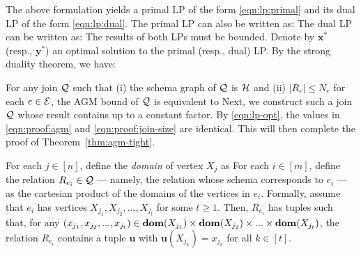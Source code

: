 \vgap

The above formulation yields a primal LP of the form \eqref{eqn:lp:primal} and its dual LP of the form \eqref{eqn:lp:dual}. The primal LP can also be written as:
The dual LP can be written as:
The results of both LPs must be bounded. Denote by $\bm{x}^*$ (resp., $\bm{y}^*$) an optimal solution to the primal (resp., dual) LP. By the strong duality theorem, we have:

\vgap

For any join $\mathcal{Q}$ such that (i) the schema graph of $\mathcal{Q}$ is $\mathcal{H}$ and (ii) $|R_e| \le N_e$ for each $e \in \mathcal{E}$, the AGM bound of $\mathcal{Q}$ is equivalent to
Next, we construct such a join $\mathcal{Q}$ whose result contains
up to a constant factor. By \eqref{eqn:lp-opt}, the values in \eqref{eqn:proof:agm} and \eqref{eqn:proof:join-size} are identical. This will then complete the proof of Theorem~\ref{thm:agm-tight}.

\vgap

For each $j \in [n]$, define the {\em domain} of vertex $X_j$ as
For each $i \in [m]$, define the relation $R_{e_i} \in \mathcal{Q}$ --- namely, the relation whose schema corresponds to $e_i$ --- as the cartesian product of the domains of the vertices in $e_i$. Formally, assume that $e_i$ has vertices $X_{j_1}, X_{j_2}, ..., X_{j_t}$ for some $t \ge 1$. Then, $R_{e_i}$ has
tuples such that, for any $(x_{j_1}, x_{j_2}, ..., x_{j_t}) \in \mathbf{dom}(X_{j_1}) \times \mathbf{dom}(X_{j_2}) \times ... \times \mathbf{dom}(X_{j_t})$, the relation $R_{e_i}$ contains a tuple $\bm{u}$ with $\bm{u}(X_{j_k}) = x_{j_k}$ for all $k \in [t]$.

